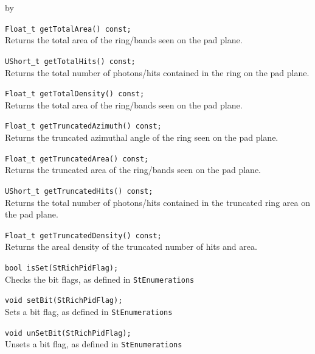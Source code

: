 \documentclass[twoside]{article}
\newcommand{\entrylabel}[1]{\mbox{\textbf{{#1}}}\hfil}%
\newenvironment{entry}
{\begin{list}{}%
    {\renewcommand{\makelabel}{\entrylabel}%
     \setlength{\labelwidth}{90pt}%
     \setlength{\leftmargin}{\labelwidth}
     \advance\leftmargin by \labelsep%
      }%
    }%
  {\end{list}}
\newcommand{\Entrylabel}[1]%
{\raisebox{0pt}[1ex][0pt]{\makebox[\labelwidth][l]%
    {\parbox[t]{\labelwidth}{\hspace{0pt}\textbf{{#1}}}}}}
\newenvironment{Entry}%
{\renewcommand{\entrylabel}{\Entrylabel}\begin{entry}}%
  {\end{entry}}
\begin{document}
\begin{Entry}
    \verb+Float_t getTotalArea() const;+\\
    Returns the total area of the ring/bands
    seen on the pad plane.
    
    \verb+UShort_t getTotalHits() const;+\\
    Returns the total number of photons/hits
    contained in the ring on the pad plane.
    
    \verb+Float_t getTotalDensity() const;+\\
    Returns the total area of the ring/bands
    seen on the pad plane.

    \verb+Float_t getTruncatedAzimuth() const;+\\
    Returns the truncated azimuthal angle of the ring
    seen on the pad plane.

    \verb+Float_t getTruncatedArea() const;+\\
    Returns the truncated area of the ring/bands
    seen on the pad plane.

    \verb+UShort_t getTruncatedHits() const;+\\
    Returns the total number of photons/hits
    contained in the truncated ring area on
    the pad plane.

    \verb+Float_t getTruncatedDensity() const;+\\
    Returns the areal density of the truncated
    number of hits and area.

    \verb+bool isSet(StRichPidFlag);+\\
    Checks the bit flags, as defined
    in \texttt{StEnumerations}
    
    \verb+void setBit(StRichPidFlag);+\\
    Sets a bit flag, as defined
    in \texttt{StEnumerations}
    
    \verb+void unSetBit(StRichPidFlag);+\\
    Unsets a bit flag, as defined
    in \texttt{StEnumerations}
    
\end{Entry}
\clearpage
\end{document}
